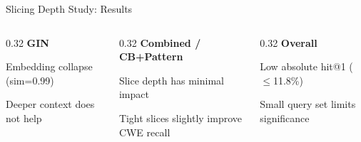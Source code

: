 \documentclass[aspectratio=169,10pt]{beamer}
\begin{document}
\begin{frame}{Slicing Depth Study: Results}
  \vspace{0.4em}
  \begin{columns}[T]
  \begin{column}{0.32\textwidth}
    {\scriptsize\textbf{\textcolor{c1}{GIN}}}
    \begin{itemize}\itemsep1pt
      {\scriptsize
      \item Embedding collapse (sim=0.99)
      \item Deeper context does not help}
    \end{itemize}
  \end{column}
  \begin{column}{0.32\textwidth}
    {\scriptsize\textbf{\textcolor{c3}{Combined / CB+Pattern}}}
    \begin{itemize}\itemsep1pt
      {\scriptsize
      \item Slice depth has minimal impact
      \item Tight slices slightly improve CWE recall}
    \end{itemize}
  \end{column}
  \begin{column}{0.32\textwidth}
    {\scriptsize\textbf{\textcolor{miss}{Overall}}}
    \begin{itemize}\itemsep1pt
      {\scriptsize
      \item Low absolute hit@1 ($\leq$11.8\%)
      \item Small query set limits significance}
    \end{itemize}
  \end{column}
  \end{columns}
\end{frame}
\end{document}
